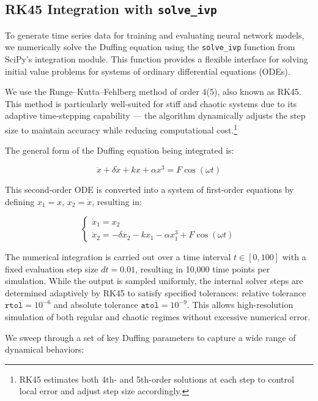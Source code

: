 \documentclass{article}
\begin{document}
\subsection{RK45 Integration with \texttt{solve\_ivp}}

To generate time series data for training and evaluating neural network models, we numerically solve the Duffing equation using the \texttt{solve\_ivp} function from SciPy’s integration module. This function provides a flexible interface for solving initial value problems for systems of ordinary differential equations (ODEs).

We use the Runge–Kutta–Fehlberg method of order 4(5), also known as RK45. This method is particularly well-suited for stiff and chaotic systems due to its adaptive time-stepping capability — the algorithm dynamically adjusts the step size to maintain accuracy while reducing computational cost.\footnote{RK45 estimates both 4th- and 5th-order solutions at each step to control local error and adjust step size accordingly.}

The general form of the Duffing equation being integrated is:

\begin{equation}
    \ddot{x} + \delta \dot{x} + kx + \alpha x^3 = F \cos(\omega t)
\end{equation}

This second-order ODE is converted into a system of first-order equations by defining $x_1 = x$, $x_2 = \dot{x}$, resulting in:

\begin{equation}
\begin{cases}
    \dot{x}_1 = x_2 \\
    \dot{x}_2 = -\delta x_2 - kx_1 - \alpha x_1^3 + F \cos(\omega t)
\end{cases}
\end{equation}

The numerical integration is carried out over a time interval $t \in [0, 100]$ with a fixed evaluation step size $dt = 0.01$, resulting in 10,000 time points per simulation. While the output is sampled uniformly, the internal solver steps are determined adaptively by RK45 to satisfy specified tolerances: relative tolerance $\texttt{rtol} = 10^{-6}$ and absolute tolerance $\texttt{atol} = 10^{-9}$. This allows high-resolution simulation of both regular and chaotic regimes without excessive numerical error.

We sweep through a set of key Duffing parameters to capture a wide range of dynamical behaviors:
\end{document}
